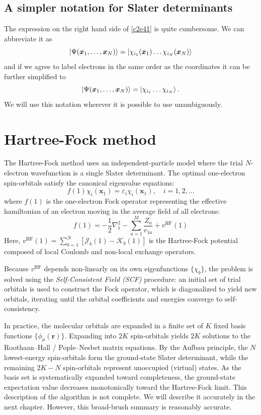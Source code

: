 \subsection{A simpler notation for Slater determinants}
The expression on the right hand side of \eqref{c2e41} is quite cumbersome. We
can abbreviate it as
\begin{equation}\label{c2e47}
\ket{\Psi(\bm{x}_1, \ldots, \bm{x}_N)} = \ket{\chi_{i_1}(\bm{x}_1)\ldots
\chi_{i_N}(\bm{x}_N)}
\end{equation}
and if we agree to label electrons in the same order as the coordinates it can
be further simplified to
\begin{equation}\label{c2e48}
\ket{\Psi(\bm{x}_1, \ldots, \bm{x}_N)} = \ket{\chi_{i_1}\ldots\chi_{i_N}}.
\end{equation}
We will use this notation wherever it is possible to use unambiguously.

\section{Hartree-Fock method}\label{c2s6}
The Hartree-Fock method uses an independent-particle model where the trial 
$N$-electron wavefunction is a single Slater determinant. The optimal 
one-electron spin-orbitals satisfy the canonical eigenvalue equations:
\begin{equation}\label{c2e49}
f(1)\chi_i(\mathbf{x}_1) = \varepsilon_i\chi_i(\mathbf{x}_1), 
\quad i = 1, 2, \dots
\end{equation}
where $f(1)$ is the one-electron Fock operator representing the effective 
hamiltonian of an electron moving in the average field of all electrons:
\begin{equation}\label{c2e50}
f(1) = -\frac{1}{2}\nabla_1^2 - \sum_{a=1}^M \frac{Z_a}{r_{1a}} + 
v^{\text{HF}}(1)
\end{equation}
Here, $v^{\text{HF}}(1) = \sum_{b=1}^N [\mathcal{J}_b(1) - \mathcal{K}_b(1)]$ 
is the Hartree-Fock potential composed of local Coulomb and non-local exchange 
operators.

Because $v^{\text{HF}}$ depends non-linearly on its own eigenfunctions 
$\{\chi_b\}$, the problem is solved using the \emph{Self-Consistent Field (SCF)}
procedure: an initial set of trial orbitals is used to construct the Fock 
operator, which is diagonalized to yield new orbitals, iterating until the 
orbital coefficients and energies converge to self-consistency.

In practice, the molecular orbitals are expanded in a finite set of $K$ fixed 
basis functions $\{\phi_\mu(\mathbf{r})\}$. Expanding into $2K$ spin-orbitals 
yields $2K$ solutions to the Roothaan–Hall / Pople–Nesbet matrix equations. By 
the Aufbau principle, the $N$ lowest-energy spin-orbitals form the ground-state 
Slater determinant, while the remaining $2K - N$ spin-orbitals represent 
unoccupied (virtual) states. As the basis set is systematically expanded toward 
completeness, the ground-state expectation value decreases monotonically toward 
the Hartree-Fock limit. This description of the algorithm is not complete. We 
will describe it accurately in the next chapter. However, this broad-brush
summary is reasonably accurate.


